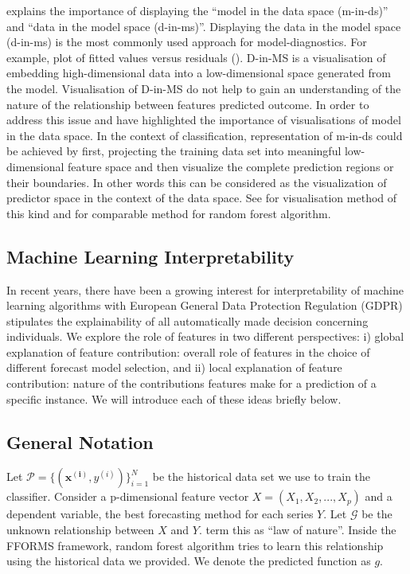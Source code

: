 \documentclass[11pt,a4paper,]{article}
\begin{document}
\textcite{wickham2015visualizing} explains the importance of displaying
the ``model in the data space (m-in-ds)'' and ``data in the model space
(d-in-ms)''. Displaying the data in the model space (d-in-ms) is the
most commonly used approach for model-diagnostics. For example, plot of
fitted values versus residuals (\textcite{wickham2015visualizing}).
D-in-MS is a visualisation of embedding high-dimensional data into a
low-dimensional space generated from the model. Visualisation of D-in-MS
do not help to gain an understanding of the nature of the relationship
between features predicted outcome. In order to address this issue
\textcite{wickham2015visualizing} and \textcite{da2017interactive} have
highlighted the importance of visualisations of model in the data space.
In the context of classification, representation of m-in-ds could be
achieved by first, projecting the training data set into meaningful
low-dimensional feature space and then visualize the complete prediction
regions or their boundaries. In other words this can be considered as
the visualization of predictor space in the context of the data space.
See \textcite{wickham2015visualizing} for visualisation method of this
kind and \textcite{da2017interactive} for comparable method for random
forest algorithm.

\subsection{Machine Learning
Interpretability}\label{machine-learning-interpretability}

In recent years, there have been a growing interest for interpretability
of machine learning algorithms with European General Data Protection
Regulation (GDPR) stipulates the explainability of all automatically
made decision concerning individuals. We explore the role of features in
two different perspectives: i) global explanation of feature
contribution: overall role of features in the choice of different
forecast model selection, and ii) local explanation of feature
contribution: nature of the contributions features make for a prediction
of a specific instance. We will introduce each of these ideas briefly
below.

\subsection{General Notation}\label{general-notation}

Let \(\mathcal{P}=\{(\mathbf{x^{(i)}}, y^{(i)})\}_{i=1}^{N}\) be the
historical data set we use to train the classifier. Consider a
p-dimensional feature vector \(X=(X_1, X_2, ..., X_p)\) and a dependent
variable, the best forecasting method for each series \(Y\). Let
\(\mathcal{G}\) be the unknown relationship between \(X\) and \(Y\).
\textcite{Zhao} term this as ``law of nature''. Inside the FFORMS
framework, random forest algorithm tries to learn this relationship
using the historical data we provided. We denote the predicted function
as \(g\).
\end{document}
